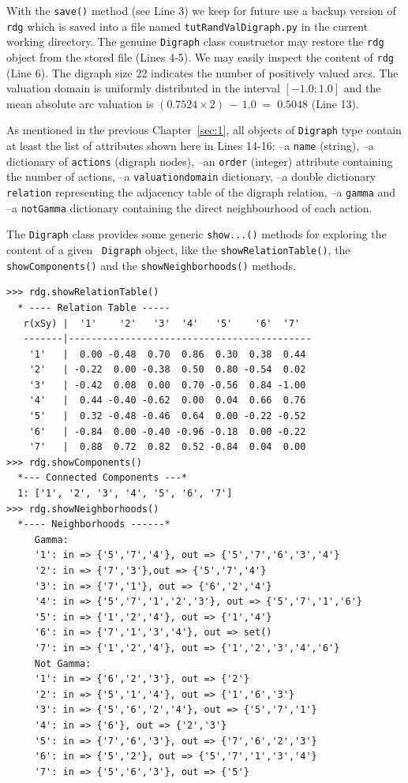 With the \texttt{save()}  method (see Line 3) we keep for future use a backup version of \texttt{rdg} which is saved into a file named \texttt{tutRandValDigraph.py} in the current working directory. The genuine \texttt{Digraph} class constructor may restore the \texttt{rdg} object from the stored file (Lines 4-5). We may easily inspect the content of \texttt{rdg} (Line 6). The digraph size 22 indicates the number of positively valued arcs. The valuation domain is uniformly distributed in the interval $[-1.0; 1.0]$ and the mean absolute arc valuation is $(0.7524 \times 2)\, -\, 1.0 \;=\; 0.5048$ (Line 13).

As mentioned in the previous Chapter~\ref{sec:1}, all objects of \texttt{Digraph} type contain at least the list of attributes shown here in Lines 14-16: --a \texttt{name} (string), --a dictionary of \texttt{actions} (digraph nodes), --an \texttt{order} (integer) attribute containing the number of actions, --a \texttt{valuationdomain} dictionary, --a double dictionary \texttt{relation} representing the adjacency table of the digraph relation, --a \texttt{gamma} and --a {\tt notGamma} dictionary containing the direct neighbourhood of each action.

The \texttt{Digraph} class provides some generic \texttt{show...()} methods for exploring the content of a given \texttt{ Digraph} object, like the \texttt{showRelationTable()}, the \texttt{showComponents()} and the \texttt{showNeighborhoods()} methods.
\begin{lstlisting}[caption={Example of random valuation digraph},label=list:2.2]
>>> rdg.showRelationTable()
  * ---- Relation Table -----
   r(xSy) |  '1'    '2'   '3'  '4'   '5'    '6'  '7'	  
   -------|-------------------------------------------
    '1'   |  0.00 -0.48  0.70  0.86  0.30  0.38  0.44	 
    '2'   | -0.22  0.00 -0.38  0.50  0.80 -0.54  0.02	 
    '3'   | -0.42  0.08  0.00  0.70 -0.56  0.84 -1.00	 
    '4'   |  0.44 -0.40 -0.62  0.00  0.04  0.66  0.76	 
    '5'   |  0.32 -0.48 -0.46  0.64  0.00 -0.22 -0.52	 
    '6'   | -0.84  0.00 -0.40 -0.96 -0.18  0.00 -0.22	 
    '7'   |  0.88  0.72  0.82  0.52 -0.84  0.04  0.00
>>> rdg.showComponents()
  *--- Connected Components ---*
  1: ['1', '2', '3', '4', '5', '6', '7']
>>> rdg.showNeighborhoods()
  *---- Neighborhoods ------*
     Gamma:
     '1': in => {'5','7','4'}, out => {'5','7','6','3','4'}
     '2': in => {'7','3'},out => {'5','7','4'}
     '3': in => {'7','1'}, out => {'6','2','4'}
     '4': in => {'5','7','1','2','3'}, out => {'5','7','1','6'}
     '5': in => {'1','2','4'}, out => {'1','4'}
     '6': in => {'7','1','3','4'}, out => set()
     '7': in => {'1','2','4'}, out => {'1','2','3','4','6'}
     Not Gamma:
     '1': in => {'6','2','3'}, out => {'2'}
     '2': in => {'5','1','4'}, out => {'1','6','3'}
     '3': in => {'5','6','2','4'}, out => {'5','7','1'}
     '4': in => {'6'}, out => {'2','3'}
     '5': in => {'7','6','3'}, out => {'7','6','2','3'}
     '6': in => {'5','2'}, out => {'5','7','1','3','4'}
     '7': in => {'5','6','3'}, out => {'5'}
\end{lstlisting}   

